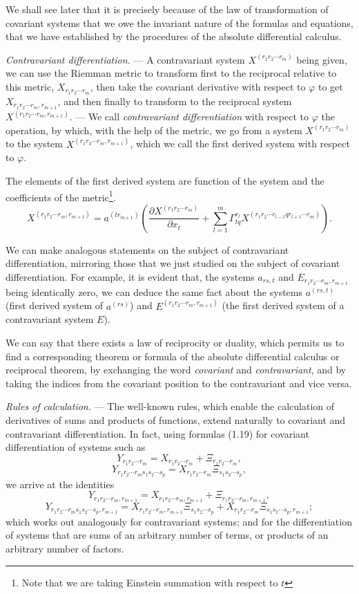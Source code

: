\documentclass{book}
\begin{document}
We shall see later that it is precisely because of the law of transformation of covariant systems that we owe the invariant nature of the formulas and equations, that we have established by the procedures of the absolute differential calculus. 

\emph{Contravariant differentiation.} --- A contravariant system $X^{(r_1r_2\cdots r_m)}$ being given, we can use the Riemman metric to transform first to the reciprocal relative to this metric, $X_{r_1r_2\cdots r_m}$, then take  the covariant derivative with respect to $\varphi$ to get $X_{r_1r_2\cdots r_m,r_{m+1}}$, and then finally to transform to the reciprocal system $X^{(r_1r_2\cdots r_m,r_{m+1})}$. --- We call \emph{contravariant differentiation} with respect to $\varphi$ the operation, by which, with the help of the metric, we go from a system $X^{(r_1r_2\cdots r_m)}$ to the system $X^{(r_1r_2\cdots r_m,r_{m+1})}$, which we call the first derived system with respect to $\varphi$.

The elements of the first derived system are function of the system and the coefficients of the metric\footnote{Note that we are taking Einstein summation with respect to $t$}.
\begin{equation}
X^{(r_1r_2\cdots r_m,r_{m+1})}=a^{(tr_{m+1})}\left(\frac{\partial X^{(r_1r_2\cdots r_m)}}{\partial x_t}+\sum_{l=1}^m\Gamma^{r_l}_{tq}X^{(r_1r_2\cdots r_{l-1}qr_{l+1}\cdots r_m)}\right).
\end{equation}

We can make analogous statements on the subject of contravariant differentiation, mirroring those that we just studied on the subject of covariant differentiation. For example, it is evident that, the systems $a_{rs,t}$ and $E_{r_1r_2\cdots r_m,r_{m+1}}$ being identically zero, we can deduce the same fact about the systems $a^{(rs,t)}$ (first derived system of $a^{(rs)}$) and $E^{(r_1r_2\cdots r_m,r_{m+1})}$ (the first derived system of a contravariant system $E$).

We can say that there exists a law of reciprocity or duality, which permits us to find a corresponding theorem or formula of the absolute differential calculus or reciprocal theorem, by exchanging the word \emph{covariant} and \emph{contravariant}, and by taking the indices from the covariant position to the contravariant and vice versa. 

\emph{Rules of calculation.} --- The well-known rules, which enable the calculation of derivatives of sums and products of functions, extend naturally to covariant and contravariant differentiation. In fact, using formulas (1.19) for covariant differentiation of systems such as
$$Y_{r_1r_2\cdots r_m}=X_{r_1r_2\cdots r_m}+\Xi_{r_1r_2\cdots r_m},$$	
$$Y_{r_1r_2\cdots r_ms_1s_2\cdots s_p}=X_{r_1r_2\cdots r_m}\Xi_{s_1s_2\cdots s_p},$$
we arrive at the identities
$$Y_{r_1r_2\cdots r_m,r_{m+1}}=X_{r_1r_2\cdots r_m,r_{m+1}}+\Xi_{r_1r_2\cdots r_m,r_{m+1}},$$
$$Y_{r_1r_2\cdots r_ms_1s_2\cdots s_p,r_{m+1}}=X_{r_1r_2\cdots r_m,r_{m+1}}\Xi_{s_1s_2\cdots s_p}+X_{r_1r_2\cdots r_m}\Xi_{s_1s_2\cdots s_p,r_{m+1}};$$
which works out analogously for contravariant systems; and for the differentiation of systems that are sums of an arbitrary number of terms, or products of an arbitrary number of factors. 
\end{document}
